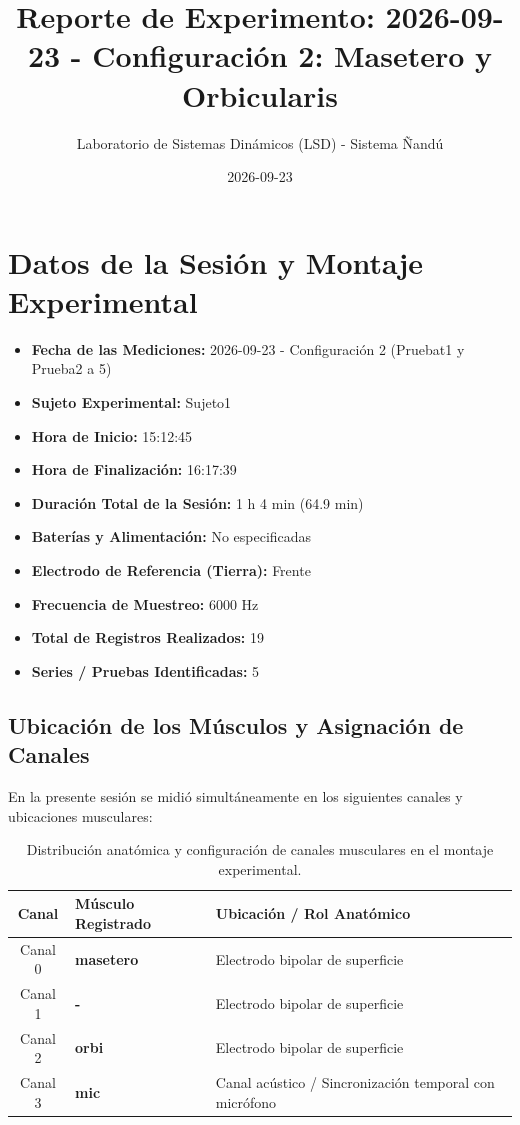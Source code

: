 \documentclass[11pt,a4paper]{article}
\title{\textbf{Reporte de Experimento: 2026-09-23 - Configuración 2: Masetero y Orbicularis}}
\author{Laboratorio de Sistemas Dinámicos (LSD) - Sistema Ñandú}
\date{2026-09-23}
\begin{document}
\maketitle

\section{Datos de la Sesión y Montaje Experimental}
\begin{itemize}
    \item \textbf{Fecha de las Mediciones:} 2026-09-23 - Configuración 2 (Pruebat1 y Prueba2 a 5)
    \item \textbf{Sujeto Experimental:} Sujeto1
    \item \textbf{Hora de Inicio:} 15:12:45
    \item \textbf{Hora de Finalización:} 16:17:39
    \item \textbf{Duración Total de la Sesión:} 1 h 4 min (64.9 min)
    \item \textbf{Baterías y Alimentación:} No especificadas
    \item \textbf{Electrodo de Referencia (Tierra):} Frente
    \item \textbf{Frecuencia de Muestreo:} 6000 Hz
    \item \textbf{Total de Registros Realizados:} 19
    \item \textbf{Series / Pruebas Identificadas:} 5
\end{itemize}

\subsection{Ubicación de los Músculos y Asignación de Canales}
En la presente sesión se midió simultáneamente en los siguientes canales y ubicaciones musculares:
\begin{table}[H]
\centering
\begin{tabularx}{\textwidth}{c p{6.5cm} X}
\toprule
\textbf{Canal} & \textbf{Músculo Registrado} & \textbf{Ubicación / Rol Anatómico} \\
\midrule
Canal 0 & \textbf{masetero} & Electrodo bipolar de superficie \\
Canal 1 & \textbf{-} & Electrodo bipolar de superficie \\
Canal 2 & \textbf{orbi} & Electrodo bipolar de superficie \\
Canal 3 & \textbf{mic} & Canal acústico / Sincronización temporal con micrófono \\
\bottomrule
\end{tabularx}
\caption{Distribución anatómica y configuración de canales musculares en el montaje experimental.}
\end{table}
\end{document}
